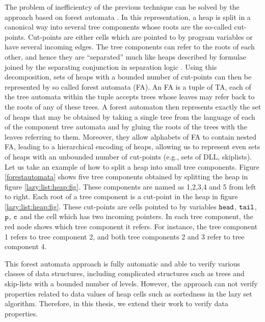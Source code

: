 The problem of inefficientcy of the previous technique can be solved by the approach based on forest automata \cite{foresterfull}. In this representation, a heap is split in a canonical way into several tree components whose roots are the so-called cut-points. Cut-points are either cells which are pointed to by program variables or have several incoming edges. The tree components can refer to the roots of each other, and hence they are “separated” much like heaps described by formulae joined by the separating conjunction in separation logic \cite{John:SL}. Using this decomposition, sets of heaps with a bounded number of cut-points can then be represented by so called forest automata (FA). An FA is a tuple of TA, each of the tree
automata within the tuple accepts trees whose leaves may refer back to the
roots of any of these trees. A forest automaton then represents exactly the set
of heaps that may be obtained by taking a single tree from the language of each
of the component tree automata and by gluing the roots of the trees with the
leaves referring to them. %
 Moreover, they allow alphabets of FA to contain nested FA, leading to a hierarchical encoding of heaps, allowing us to represent even sets of heaps with an unbounded number of cut-points (e.g., sets of DLL, skiplists). 
Let us take an example of how to split a heap into small tree components. Figure \ref{forestautomata} shows five tree components obtained by splitting the heap in figure \ref{lazy:list:heap:fig}. These components are named as 1,2,3,4 and 5 from left to right. Each root of a tree component is a cut-point in the heap in figure \ref{lazy:list:heap:fig}. These cut-points are cells pointed to by variables $\tt head$, $\tt tail$,  $\tt p$,  $\tt c$ and the cell which has two incoming pointers. In each tree component, the red node shows which  tree component it refers. For instance, the tree component 1 refers to tree component 2, and both tree components 2 and 3 refer to tree component 4.

This forest automata approach is fully automatic and able to verify various classes of data structures, including complicated structures such as trees and skip-lists with a bounded number of levels. 
However, the approach can not verify properties related to data values of heap cells such as sortedness in the lazy set algorithm. Therefore, in this thesis, we extend their work to verify data properties. 

